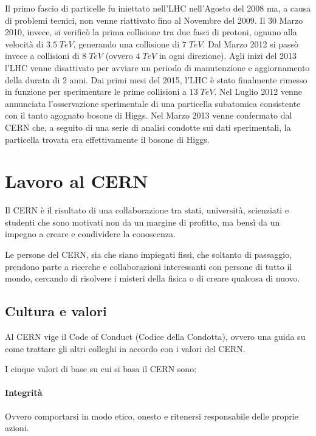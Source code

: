 			Il primo fascio di particelle fu iniettato nell'\ac{LHC} nell'Agosto del 2008 ma, a causa di problemi tecnici, non venne riattivato fino al Novembre del 2009. Il 30 Marzo 2010, invece, si verificò la prima collisione tra due fasci di protoni, ognuno alla velocità di $3.5 \; TeV$, generando una collisione di $7 \; TeV$. Dal Marzo 2012 si passò invece a collisioni di $8 \; TeV$ (ovvero $4 \; TeV$ in ogni direzione). Agli inizi del 2013 l'\ac{LHC} venne disattivato per avviare un periodo di manutenzione e aggiornamento della durata di 2 anni. Dai primi mesi del 2015, l'\ac{LHC} è stato finalmente rimesso in funzione per sperimentare le prime collisioni a $13 \; TeV$. Nel Luglio 2012 venne annunciata l'osservazione sperimentale di una particella subatomica consistente con il tanto agognato bosone di Higgs. Nel Marzo 2013 venne confermato dal \ac{CERN} che, a seguito di una serie di analisi condotte sui dati sperimentali, la particella trovata era effettivamente il bosone di Higgs.
	
	\section{Lavoro al CERN} \label{sec:C;lavoro}
	
		Il \ac{CERN} è il risultato di una collaborazione tra stati, università, scienziati e studenti che sono motivati non da un margine di profitto, ma bensì da un impegno a creare e condividere la conoscenza.
		
		Le persone del \ac{CERN}, sia che siano impiegati fissi, che soltanto di passaggio, prendono parte a ricerche e collaborazioni interessanti con persone di tutto il mondo, cercando di risolvere i misteri della fisica o di creare qualcosa di nuovo.
		
		\subsection{Cultura e valori} \label{subsec:C;l;cultura_e_valori}
		
			Al \ac{CERN} vige il Code of Conduct (Codice della Condotta), ovvero una guida su come trattare gli altri colleghi in accordo con i valori del \ac{CERN}. \cite{cern:culture_values}
			
			I cinque valori di base su cui si basa il \ac{CERN} sono:
			
			\paragraph{Integrit\`{a}}Ovvero comportarsi in modo etico, onesto e ritenersi responsabile delle proprie azioni.
			
